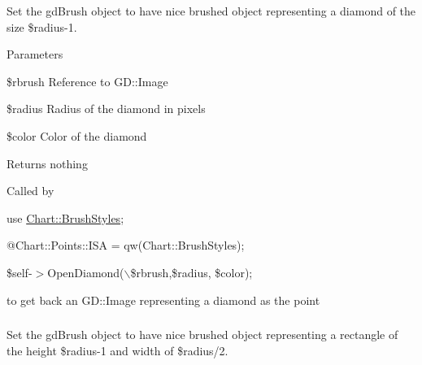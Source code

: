 Set the gdBrush object to have nice brushed object representing a diamond of the size \$radius-\/1. 


\begin{DoxyParams}{Parameters}
\item[\mbox{\tt[in]} {\em $\ast$GD::Image}]\$rbrush Reference to GD::Image \item[\mbox{\tt[in]} {\em int}]\$radius Radius of the diamond in pixels \item[\mbox{\tt[in]} {\em int}]\$color Color of the diamond \end{DoxyParams}
\begin{DoxyReturn}{Returns}
nothing
\end{DoxyReturn}
Called by\par
 use \hyperlink{classChart_1_1BrushStyles}{Chart::BrushStyles};\par
 @Chart::Points::ISA = qw(Chart::BrushStyles);\par
 \$self-\/$>$OpenDiamond($\backslash$\$rbrush,\$radius, \$color);\par
 to get back an GD::Image representing a diamond as the point \hypertarget{classChart_1_1BrushStyles_a3d17237567c35f8844e29e2bc7b03609}{
\subsubsection[{OpenRectangle}]{}}
\label{classChart_1_1BrushStyles_a3d17237567c35f8844e29e2bc7b03609}


Set the gdBrush object to have nice brushed object representing a rectangle of the height \$radius-\/1 and width of \$radius/2. 


